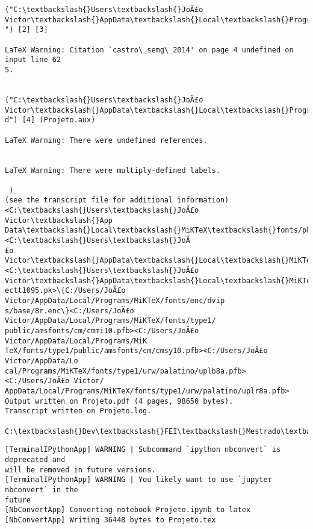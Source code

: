 \documentclass[11pt]{article}
\makeatletter
\newcommand{\boxspacing}{\kern\kvtcb@left@rule\kern\kvtcb@boxsep}
\newcommand{\prompt}[4]{
        {\ttfamily\llap{{\color{#2}[#3]:\hspace{3pt}#4}}\vspace{-\baselineskip}}
    }
\makeatother
\begin{document}
\begin{Verbatim}[commandchars=\\\{\}]
("C:\textbackslash{}Users\textbackslash{}JoÃ£o Victor\textbackslash{}AppData\textbackslash{}Local\textbackslash{}Programs\textbackslash{}MiKTeX\textbackslash{}tex/latex/base\textbackslash{}ts1cmtt.fd
") [2] [3]

LaTeX Warning: Citation `castro\_semg\_2014' on page 4 undefined on input line 62
5.


("C:\textbackslash{}Users\textbackslash{}JoÃ£o Victor\textbackslash{}AppData\textbackslash{}Local\textbackslash{}Programs\textbackslash{}MiKTeX\textbackslash{}tex/latex/psnfss\textbackslash{}ts1ppl.f
d") [4] (Projeto.aux)

LaTeX Warning: There were undefined references.


LaTeX Warning: There were multiply-defined labels.

 )
(see the transcript file for additional information) <C:\textbackslash{}Users\textbackslash{}JoÃ£o Victor\textbackslash{}App
Data\textbackslash{}Local\textbackslash{}MiKTeX\textbackslash{}fonts/pk/ljfour/jknappen/ec/dpi600\textbackslash{}ecit1095.pk> <C:\textbackslash{}Users\textbackslash{}JoÃ
£o Victor\textbackslash{}AppData\textbackslash{}Local\textbackslash{}MiKTeX\textbackslash{}fonts/pk/ljfour/jknappen/ec/dpi600\textbackslash{}tctt1095.pk>
<C:\textbackslash{}Users\textbackslash{}JoÃ£o Victor\textbackslash{}AppData\textbackslash{}Local\textbackslash{}MiKTeX\textbackslash{}fonts/pk/ljfour/jknappen/ec/dpi600\textbackslash{}
ectt1095.pk>\{C:/Users/JoÃ£o Victor/AppData/Local/Programs/MiKTeX/fonts/enc/dvip
s/base/8r.enc\}<C:/Users/JoÃ£o Victor/AppData/Local/Programs/MiKTeX/fonts/type1/
public/amsfonts/cm/cmmi10.pfb><C:/Users/JoÃ£o Victor/AppData/Local/Programs/MiK
TeX/fonts/type1/public/amsfonts/cm/cmsy10.pfb><C:/Users/JoÃ£o Victor/AppData/Lo
cal/Programs/MiKTeX/fonts/type1/urw/palatino/uplb8a.pfb><C:/Users/JoÃ£o Victor/
AppData/Local/Programs/MiKTeX/fonts/type1/urw/palatino/uplr8a.pfb>
Output written on Projeto.pdf (4 pages, 98650 bytes).
Transcript written on Projeto.log.

C:\textbackslash{}Dev\textbackslash{}FEI\textbackslash{}Mestrado\textbackslash{}3\_Periodo\textbackslash{}PEL301\_Biopotenciais\textbackslash{}Projeto>
    \end{Verbatim}

    \begin{Verbatim}[commandchars=\\\{\}]
[TerminalIPythonApp] WARNING | Subcommand `ipython nbconvert` is deprecated and
will be removed in future versions.
[TerminalIPythonApp] WARNING | You likely want to use `jupyter nbconvert` in the
future
[NbConvertApp] Converting notebook Projeto.ipynb to latex
[NbConvertApp] Writing 36448 bytes to Projeto.tex
    \end{Verbatim}

    \begin{tcolorbox}[breakable, size=fbox, boxrule=1pt, pad at break*=1mm,colback=cellbackground, colframe=cellborder]
\prompt{In}{incolor}{ }{\boxspacing}
\begin{Verbatim}[commandchars=\\\{\}]

\end{Verbatim}
\end{tcolorbox}


    
    
    
\end{document}
